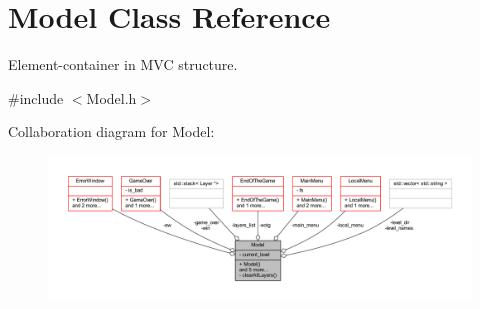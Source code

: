 \hypertarget{class_model}{}\section{Model Class Reference}
\label{class_model}


Element-\/container in M\+VC structure.  




{\ttfamily \#include $<$Model.\+h$>$}



Collaboration diagram for Model\+:\nopagebreak
\begin{figure}[H]
\begin{center}
\leavevmode
\includegraphics[width=350pt]{class_model__coll__graph}
\end{center}
\end{figure}
